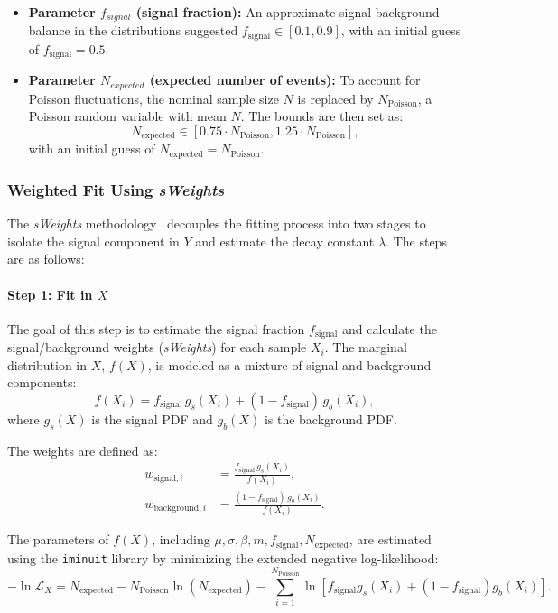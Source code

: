 \documentclass[11pt, a4paper]{article}
\begin{document}
\begin{itemize}
    \item \textbf{Parameter \( f_{{signal}} \) (signal fraction):} An approximate signal-background balance in the distributions suggested \( f_{\text{signal}} \in [0.1, 0.9] \), with an initial guess of \( f_{\text{signal}} = 0.5 \).

    \item \textbf{Parameter \( N_{{expected}} \) (expected number of events):}  
To account for Poisson fluctuations, the nominal sample size \( N \) is replaced by \( N_{\text{Poisson}} \), a Poisson random variable with mean \( N \). The bounds are then set as:  
\[
N_{\text{expected}} \in [0.75 \cdot N_{\text{Poisson}}, 1.25 \cdot N_{\text{Poisson}}],
\]
with an initial guess of \( N_{\text{expected}} = N_{\text{Poisson}} \).

\end{itemize}




\subsubsection{Weighted Fit Using \textit{sWeights}}


The \textit{sWeights} methodology~\cite{dembinski2022custom} decouples the fitting process into two stages to isolate the signal component in \( Y \) and estimate the decay constant \( \lambda \). The steps are as follows:

\paragraph{Step 1: Fit in \(X\)}The goal of this step is to estimate the signal fraction \( f_{\text{signal}} \) and calculate the signal/background weights (\textit{sWeights}) for each sample \( X_i \). The marginal distribution in \( X \), \( f(X) \), is modeled as a mixture of signal and background components:
\[
f(X_i) = f_{\text{signal}} \, g_s(X_i) + (1 - f_{\text{signal}}) \, g_b(X_i),
\]
where \( g_s(X) \) is the signal PDF and \( g_b(X) \) is the background PDF.

The weights are defined as:
\begin{align}
    w_{\text{signal},i} &= \frac{f_{\text{signal}} \, g_s(X_i)}{f(X_i)}, \label{eq:sweight_signal} \\
    w_{\text{background},i} &= \frac{(1 - f_{\text{signal}}) \, g_b(X_i)}{f(X_i)}. \label{eq:sweight_background}
\end{align}

The parameters of \( f(X) \), including \( \mu, \sigma, \beta, m, f_{\text{signal}}, N_{\text{expected}} \), are estimated using the \texttt{iminuit} library by minimizing the extended negative log-likelihood:
\begin{equation}
    -\ln \mathcal{L}_X = N_{\text{expected}} - N_{\text{Poisson}} \ln(N_{\text{expected}}) - \sum_{i=1}^{N_{\text{Poisson}}} \ln \left[ f_{\text{signal}} g_s(X_i) + (1 - f_{\text{signal}}) g_b(X_i) \right].
\end{equation}
\end{document}
